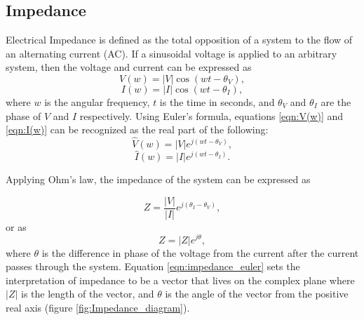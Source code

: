  \subsection*{Impedance}
 \par Electrical Impedance is defined as the total opposition of a system to the flow of an alternating current (AC). If a sinusoidal voltage is applied to an arbitrary system, then the voltage and current can be expressed as
 \begin{equation}
    V(w) = |V|\cos(wt-\theta_V),
    \label{eqn:V(w)}
 \end{equation}
 \begin{equation}
    I(w) = |I|\cos(wt - \theta_I),
    \label{eqn:I(w)}
 \end{equation}
 \noindent where $w$ is the angular frequency, $t$ is the time in seconds, and $\theta_V$ and $\theta_I$ are the phase of $V$ and $I$ respectively. Using Euler's formula, equations \ref{eqn:V(w)} and \ref{eqn:I(w)} can be recognized as the real part of the following:
 \begin{equation}
    \hat{V}(w) = |V|e^{j(wt-\theta_V)},
 \end{equation}
 \begin{equation}
     \hat{I}(w) = |I|e^{j(wt-\theta_I)}.
 \end{equation}
 
 \noindent Applying Ohm's law, the impedance of the system can be expressed as
 
 \begin{equation}
    Z = \frac{|V|}{|I|}e^{j(\theta_I-\theta_V)},
 \end{equation}
 \noindent or as 
 \begin{equation}
     Z = |Z|e^{j\theta},
     \label{eqn:impedance_euler}
 \end{equation}
 \noindent where $\theta$ is the difference in phase of the voltage from the current after the current passes through the system. Equation \ref{eqn:impedance_euler} sets the interpretation of impedance to be a vector that lives on the complex plane where $|Z|$ is the length of the vector, and $\theta$ is the angle of the vector from the positive real axis (figure \ref{fig:Impedance_diagram}).
 
